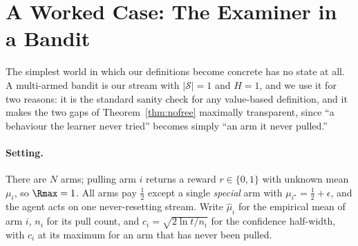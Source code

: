 
\section{A Worked Case: The Examiner in a Bandit}
\label{sec:bandit}

The simplest world in which our definitions become concrete has no state at all.
A multi-armed bandit is our stream with $|\mathcal{S}|=1$ and $H=1$, and we use it for
two reasons: it is the standard sanity check for any value-based definition, and it
makes the two gaps of Theorem~\ref{thm:nofree} maximally transparent, since
``a behaviour the learner never tried'' becomes simply ``an arm it never pulled.''

\paragraph{Setting.} There are $N$ arms; pulling arm $i$ returns a reward
$r\in\{0,1\}$ with unknown mean $\mu_i$, so $\Rmax=1$. All arms pay $\tfrac12$ except a
single \emph{special} arm with $\mu_{i^\star}=\tfrac12+\epsilon$, and the agent acts on
one never-resetting stream. Write $\hat\mu_i$ for the empirical mean of arm $i$, $n_i$
for its pull count, and $c_i=\sqrt{2\ln t / n_i}$ for the confidence half-width, with
$c_i$ at its maximum for an arm that has never been pulled.

